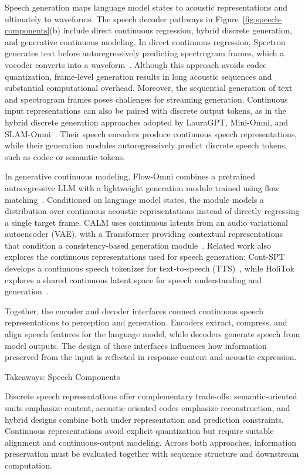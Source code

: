 Speech generation maps language model states to acoustic representations and ultimately to waveforms. The speech decoder pathways in Figure~\ref{fig:speech-components}(b) include direct continuous regression, hybrid discrete generation, and generative continuous modeling. In direct continuous regression, Spectron generates text before autoregressively predicting spectrogram frames, which a vocoder converts into a waveform~\citep{DBLP:conf/iclr/NachmaniLHSAMRS24}. Although this approach avoids codec quantization, frame-level generation results in long acoustic sequences and substantial computational overhead. Moreover, the sequential generation of text and spectrogram frames poses challenges for streaming generation. Continuous input representations can also be paired with discrete output tokens, as in the hybrid discrete generation approaches adopted by LauraGPT, Mini-Omni, and SLAM-Omni~\citep{DBLP:journals/corr/abs-2310-04673,DBLP:journals/corr/abs-2408-16725,DBLP:conf/acl/Chen0YLLXN00L0025}. Their speech encoders produce continuous speech representations, while their generation modules autoregressively predict discrete speech tokens, such as codec or semantic tokens.

In generative continuous modeling, Flow-Omni combines a pretrained autoregressive LLM with a lightweight generation module trained using flow matching~\citep{DBLP:journals/corr/abs-2412-04917}. Conditioned on language model states, the module models a distribution over continuous acoustic representations instead of directly regressing a single target frame. CALM uses continuous latents from an audio variational autoencoder (VAE), with a Transformer providing contextual representations that condition a consistency-based generation module~\citep{DBLP:conf/iclr/RouardORZD26}. Related work also explores the continuous representations used for speech generation: Cont-SPT develops a continuous speech tokenizer for text-to-speech (TTS)~\citep{DBLP:conf/naacl/LiXSCK25}, while HoliTok explores a shared continuous latent space for speech understanding and generation~\citep{DBLP:journals/corr/abs-2605-29948}.

Together, the encoder and decoder interfaces connect continuous speech representations to perception and generation. Encoders extract, compress, and align speech features for the language model, while decoders generate speech from model outputs. The design of these interfaces influences how information preserved from the input is reflected in response content and acoustic expression.

\begin{TakeawayBox}{Takeaways: Speech Components}

Discrete speech representations offer complementary trade-offs: semantic-oriented units emphasize content, acoustic-oriented codes emphasize reconstruction, and hybrid designs combine both under representation and prediction constraints. Continuous representations avoid explicit quantization but require suitable alignment and continuous-output modeling. Across both approaches, information preservation must be evaluated together with sequence structure and downstream computation.
\end{TakeawayBox}


